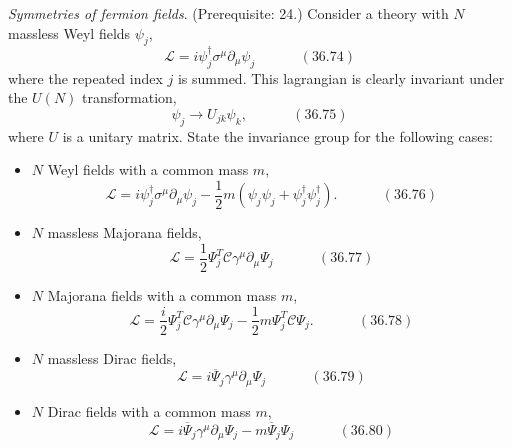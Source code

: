 \documentclass[twoside]{amsart}
\newcommand{\problemhead}[1]
  {\smallskip
   \noindent{\large\bf Problem #1.}
   }
\begin{document}
\problemhead{36.5} \emph{Symmetries of fermion fields}.  (Prerequisite: 24.)  Consider a theory with $N$ massless Weyl fields $\psi_j$, 
\[
\mathcal{L} = i \psi_j^{\dag} \sigma^{\mu} \partial_{\mu} \psi_j \quad \quad \quad \, (36.74)
\]
where the repeated index $j$ is summed.  This lagrangian is clearly invariant under the $U(N)$ transformation, 
\[
\psi_j \to U_{jk} \psi_k, \quad \quad \quad \,  (36.75)
\]
where $U$ is a unitary matrix.  State the invariance group for the following cases:
\begin{itemize}
\item[(a)] $N$ Weyl fields with a common mass $m$, 
\[
\mathcal{L} = i \psi_j^{\dag} \sigma^{\mu} \partial_{\mu} \psi_j - \frac{1}{2} m (\psi_j \psi_j + \psi_j^{\dag} \psi_j^{\dag} ).  \quad \quad \quad \, (36.76)
\]
\item[(b)] $N$ massless Majorana fields,
\[
\mathcal{L} = \frac{1}{2} \Psi_j^T \mathcal{C} \gamma^{\mu}  \partial_{\mu} \Psi_j \quad \quad \quad \, (36.77)
\]
\item[(c)] $N$ Majorana fields with a common mass $m$, 
\[
\mathcal{L} = \frac{i}{2} \Psi_j^T \mathcal{C} \gamma^{\mu} \partial_{\mu} \Psi_j - \frac{1}{2} m \Psi_j^T \mathcal{C} \Psi_j.  \quad \quad \quad \, (36.78) 
\]
\item[(d)] $N$ massless Dirac fields, 
\[
\mathcal{L} = i \overline{\Psi}_j \gamma^{\mu} \partial_{\mu} \Psi_j \quad \quad \quad \, (36.79)  
\]
\item[(e)] $N$ Dirac fields with a common mass $m$,
\[
\mathcal{L} = i \overline{\Psi}_j \gamma^{\mu} \partial_{\mu} \Psi_j - m \overline{\Psi}_j \Psi_j \quad \quad \quad \, (36.80)   
\]
\end{itemize}
\end{document}
